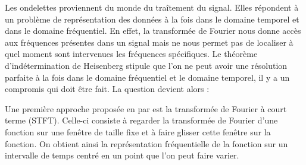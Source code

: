 
Les ondelettes proviennent du monde du traîtement du signal. Elles répondent à un problème de représentation des données à la fois dans le domaine temporel et dans le domaine fréquentiel. En effet, la transformée de Fourier nous donne accès aux fréquences présentes dans un signal mais ne nous permet pas de localiser à quel moment sont intervenues les fréquences spécifiques. Le théorème d'indétermination de Heisenberg stipule que l'on ne peut avoir une résolution parfaite à la fois dans le domaine fréquentiel et le domaine temporel, il y a un compromis qui doit être fait. La question devient alors :


Une première approche proposée en 
 par 
est la transformée de Fourier à court terme (STFT). Celle-ci consiste à regarder la transformée de Fourier d'une fonction sur une fenêtre de taille fixe et à faire glisser cette fenêtre sur la fonction. On obtient ainsi la représentation fréquentielle de la fonction sur un intervalle de temps centré en un point que l'on peut faire varier. 

\bigskip

